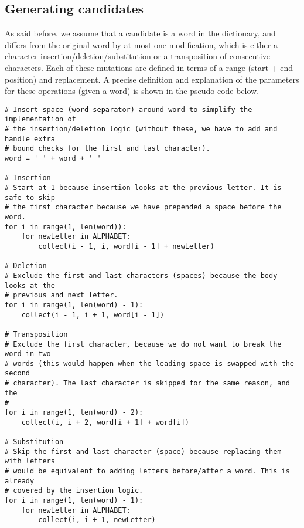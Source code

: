 \documentclass[11pt,a4paper]{article}
\begin{document}
\subsection{Generating candidates}\label{generateCandidateWords}
As said before, we assume that a candidate is a word in the dictionary, and differs from the original word by at most one modification, which is either a character insertion/deletion/substitution or a transposition of consecutive characters.
Each of these mutations are defined in terms of a range (start + end position) and replacement.
A precise definition and explanation of the parameters for these operations (given a word) is shown in the pseudo-code below.

\begin{lstlisting}
# Insert space (word separator) around word to simplify the implementation of
# the insertion/deletion logic (without these, we have to add and handle extra
# bound checks for the first and last character).
word = ' ' + word + ' '

# Insertion
# Start at 1 because insertion looks at the previous letter. It is safe to skip
# the first character because we have prepended a space before the word.
for i in range(1, len(word)):
    for newLetter in ALPHABET:
        collect(i - 1, i, word[i - 1] + newLetter)

# Deletion
# Exclude the first and last characters (spaces) because the body looks at the
# previous and next letter.
for i in range(1, len(word) - 1):
    collect(i - 1, i + 1, word[i - 1])

# Transposition
# Exclude the first character, because we do not want to break the word in two
# words (this would happen when the leading space is swapped with the second
# character). The last character is skipped for the same reason, and the
# 
for i in range(1, len(word) - 2):
    collect(i, i + 2, word[i + 1] + word[i])

# Substitution
# Skip the first and last character (space) because replacing them with letters
# would be equivalent to adding letters before/after a word. This is already
# covered by the insertion logic.
for i in range(1, len(word) - 1):
    for newLetter in ALPHABET:
        collect(i, i + 1, newLetter)
\end{lstlisting}



\end{document}
